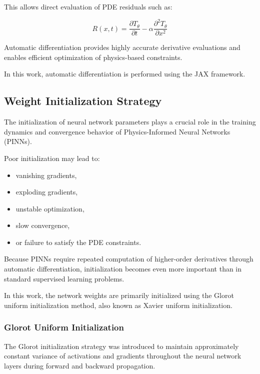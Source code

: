This allows direct evaluation of PDE residuals such as:

\begin{equation}
R(x,t)
=
\frac{\partial T_{\theta}}{\partial t}
-
\alpha
\frac{\partial^2 T_{\theta}}{\partial x^2}
\end{equation}

Automatic differentiation provides highly accurate derivative evaluations and enables efficient optimization of physics-based constraints.

In this work, automatic differentiation is performed using the JAX framework.

\subsection{Weight Initialization Strategy}

The initialization of neural network parameters plays a crucial role in the training dynamics and convergence behavior of Physics-Informed Neural Networks (PINNs).

Poor initialization may lead to:
\begin{itemize}
    \item vanishing gradients,
    \item exploding gradients,
    \item unstable optimization,
    \item slow convergence,
    \item or failure to satisfy the PDE constraints.
\end{itemize}

Because PINNs require repeated computation of higher-order derivatives through automatic differentiation, initialization becomes even more important than in standard supervised learning problems.

In this work, the network weights are primarily initialized using the Glorot uniform initialization method, also known as Xavier uniform initialization.

\subsubsection{Glorot Uniform Initialization}

The Glorot initialization strategy was introduced to maintain approximately constant variance of activations and gradients throughout the neural network layers during forward and backward propagation.

